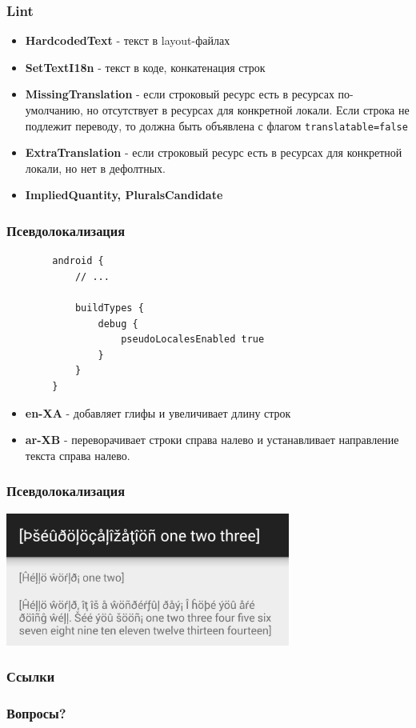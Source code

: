 \documentclass{beamer}
\begin{document}
\begin{frame}
    \frametitle{Lint}
    \begin{itemize}
        \item \textbf{HardcodedText} - текст в layout-файлах
        \item \textbf{SetTextI18n} - текст в коде, конкатенация строк
        \item \textbf{MissingTranslation} - если строковый ресурс есть в
            ресурсах по-умолчанию, но отсутствует в ресурсах для конкретной
            локали. Если строка не подлежит переводу, то
            должна быть объявлена с флагом \texttt{translatable=false}
        \item \textbf{ExtraTranslation} - если строковый ресурс есть в ресурсах
			для конкретной локали, но нет в дефолтных.
        \item \textbf{ImpliedQuantity, PluralsCandidate}
    \end{itemize}
\end{frame}

\begin{frame}[fragile]
    \frametitle{Псевдолокализация}
    \begin{verbatim}
        android {
            // ...

            buildTypes {
                debug {
                    pseudoLocalesEnabled true
                }
            }
        }
    \end{verbatim}
    \begin{itemize}
        \item \textbf{en-XA} - добавляет глифы и увеличивает длину строк
        \item \textbf{ar-XB} - переворачивает строки справа налево и устанавливает
            направление текста справа налево.
    \end{itemize}
\end{frame}

\begin{frame}
    \frametitle{Псевдолокализация}
    \begin{center}
        \includegraphics[width=0.7\textwidth,keepaspectratio]{images/pseudolocalization}
    \end{center}
\end{frame}

\begin{frame}
    \frametitle{Ссылки}
    \nocite{*}
    \RaggedRight
    \AtNextBibliography{\scriptsize}
    \printbibliography[heading=none]
\end{frame}

\begin{frame}
    \frametitle{Вопросы?}
\end{frame}
\end{document}
